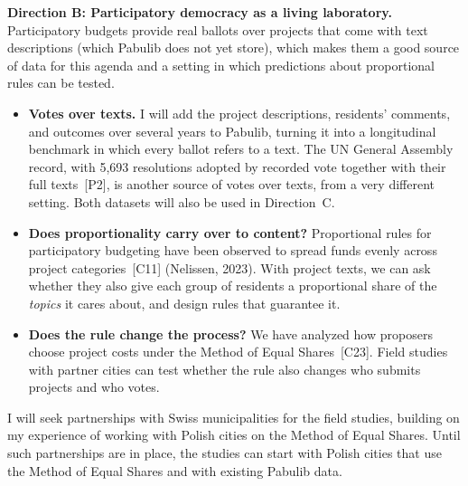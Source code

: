 \documentclass[11pt,a4paper]{article}
\newcommand{\direction}[1]{\textbf{\color{accent}#1}}
\newcommand{\pub}[1]{~[#1]}
\newcommand{\problem}[1]{\item \textbf{#1}}
\begin{document}
\direction{Direction B: Participatory democracy as a living laboratory.}
Participatory budgets provide real ballots over projects that come with text
descriptions (which Pabulib does not yet store), which makes them a good
source of data for this agenda and a setting in which predictions about
proportional rules can be tested.
\begin{itemize}
  \problem{Votes over texts.} I will add the project descriptions,
  residents' comments, and outcomes over several years to Pabulib, turning it
  into a longitudinal benchmark in which every ballot refers to a text.
  The UN General Assembly record, with 5{,}693 resolutions adopted by
  recorded vote together with their full texts\pub{P2}, is another source of votes over texts, from a very different setting. Both
datasets will also be used in Direction~C.
  \problem{Does proportionality carry over to content?} Proportional rules
  for participatory budgeting have been observed to spread funds evenly
  across project categories\pub{C11} (Nelissen, 2023). With project texts, we
  can
  ask whether they also give each group of residents a proportional share of
  the \emph{topics} it cares about, and design rules that guarantee it.
  \problem{Does the rule change the process?} We have analyzed how proposers
  choose project costs under the Method of Equal Shares\pub{C23}.
  Field studies with partner cities can test whether the rule also changes
who submits projects and who votes.
\end{itemize}
I will seek partnerships with Swiss municipalities for the field studies,
building on my experience of working with Polish cities on the Method of
Equal Shares. Until such partnerships are in place, the studies can start with
Polish cities that use the Method of Equal Shares and with existing Pabulib
data.
\end{document}
